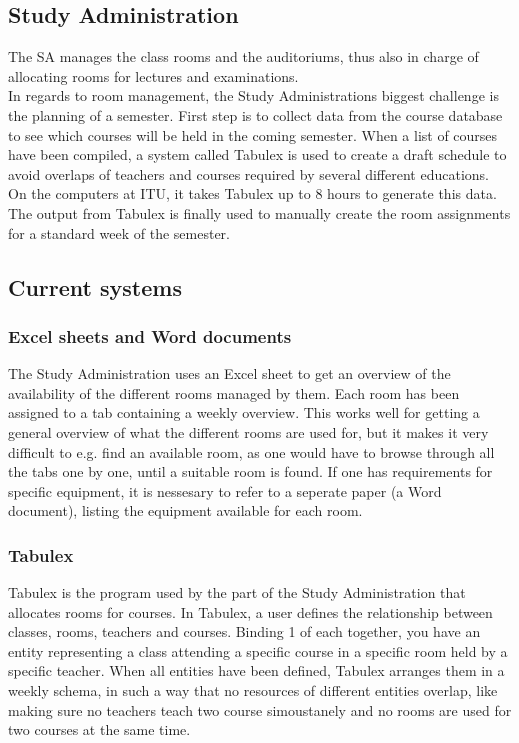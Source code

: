 \subsection{Study Administration}
The SA manages the class rooms and the auditoriums, thus also in charge of allocating rooms for lectures and examinations. \\
In regards to room management, the Study Administrations biggest challenge is the planning of a semester. First step is to collect data from the course database to see which courses will be held in the coming semester. When a list of courses have been compiled, a system called Tabulex is used to create a draft schedule to avoid overlaps of teachers and courses required by several different educations. On the computers at ITU, it takes Tabulex up to 8 hours to generate this data. The output from Tabulex is finally used to manually create the room assignments for a standard week of the semester.\\

\subsection{Current systems}
\label{sub:current_systems}
\subsubsection*{Excel sheets and Word documents}
The Study Administration uses an Excel sheet to get an overview of the availability of the different rooms managed by them. Each room has been assigned to a tab containing a weekly overview. This works well for getting a general overview of what the different rooms are used for, but it makes it very difficult to e.g. find an available room, as one would have to browse through all the tabs one by one, until a suitable room is found. If one has requirements for specific equipment, it is nessesary to refer to a seperate paper (a Word document), listing the equipment available for each room.

\subsubsection*{Tabulex}
\label{subsub:tabulex}
Tabulex is the program used by the part of the Study Administration that allocates rooms for courses. In Tabulex, a user defines the relationship between classes, rooms, teachers and courses. Binding 1 of each together, you have an entity representing a class attending a specific course in a specific room held by a specific teacher. When all entities have been defined, Tabulex arranges them in a weekly schema, in such a way that no resources of different entities overlap, like making sure no teachers teach two course simoustanely and no rooms are used for two courses at the same time.\\

